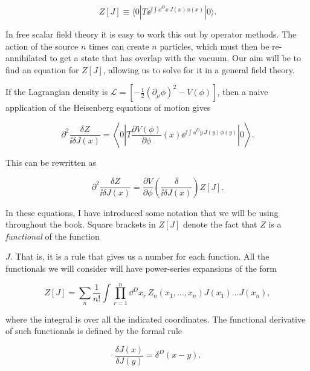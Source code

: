 \begin{equation}
Z[J]\equiv\langle0|T\ee^{\ii\int\dd^D x\,J(x)\phi(x)}|0\rangle.
\label{eq:3.3}
\end{equation}

In free scalar field theory it is easy to work this out by operator methods. The action
of the source $n$ times can create $n$ particles, which must then be re-annihilated to get a
state that has overlap with the vacuum. Our aim will be to find an equation for $Z[J]$,
allowing us to solve for it in a general field theory.

If the Lagrangian density is $\mathcal L=[-\frac12(\partial_\mu\phi)^2-V(\phi)]$, then a naive application of the
Heisenberg equations of motion gives

\begin{equation}
  \partial^2\frac{\delta Z}{\ii\delta J(x)}
  =\left\langle0\left|T\frac{\partial V(\phi)}{\partial\phi}(x)\ee^{\ii\int\dd^D y\,J(y)\phi(y)}\right|0\right\rangle.
  \label{eq:3.4}
\end{equation}

This can be rewritten as

\begin{equation}
  \partial^2\frac{\delta Z}{\ii\delta J(x)}
  =\frac{\partial V}{\partial\phi}\left(\frac{\delta}{\ii\delta J(x)}\right)Z[J].
  \label{eq:3.5}
\end{equation}

In these equations, I have introduced some notation that we will be using throughout
the book. Square brackets in $Z[J]$ denote the fact that $Z$ is a \emph{functional} of the function

$J$. That is, it is a rule that gives us a number for each function. All the functionals we
will consider will have power-series expansions of the form

\[
  Z[J]=\sum_n\frac{1}{n!}\int\prod_{r=1}^n\dd^D x_r\,Z_n(x_1,\ldots,x_n)J(x_1)\ldots J(x_n),
\]

where the integral is over all the indicated coordinates. The functional derivative of
such functionals is defined by the formal rule

\[
  \frac{\delta J(x)}{\delta J(y)}=\delta^D(x-y).
\]

